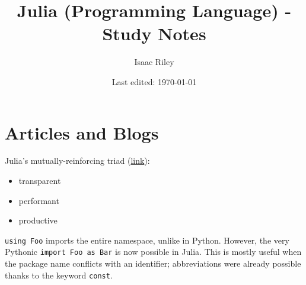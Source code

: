 \documentclass[a4paper]{article}
\title{Julia (Programming Language) - Study Notes}
\author{Isaac Riley}
\date{Last edited: \today}
\begin{document}
\maketitle
\tableofcontents
\newpage


\section{Articles and Blogs}
Julia's mutually-reinforcing triad (\href{https://redrapids.medium.com/why-is-julias-flux-catching-fire-for-ml-8763848df90c}{link}):
\begin{itemize}
    \item transparent
    \item performant
    \item productive
\end{itemize}

\noindent\texttt{using Foo} imports the entire namespace, unlike in Python. However, the very Pythonic \texttt{import Foo as Bar} is now possible in Julia. This is mostly useful when the package name conflicts with an identifier; abbreviations were already possible thanks to the keyword \texttt{const}.
\end{document}
